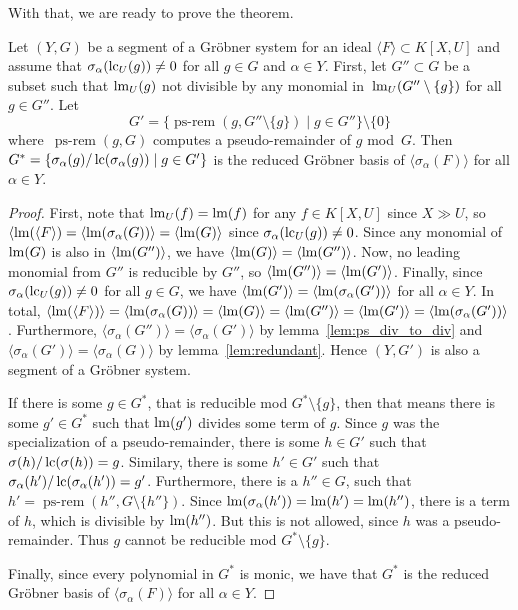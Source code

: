 With that, we are ready to prove the theorem.

\begin{theorem}\label{thm:reduce_grb_system}
  Let $(Y, G)$ be a segment of a Gröbner system for an ideal $\langle F \rangle \subset K[X, U]$ and assume that $\sigma_{\alpha}(\operatorname{lc}_{U}(g)) \neq 0$ for all $g \in G$ and $\alpha \in Y$. First, let $G'' \subset G$ be a subset such that $\operatorname{lm}_{U}(g)$ not divisible by any monomial in $\,\operatorname{lm}_{U}(G'' \setminus \{g\})$ for all $g \in G''$. Let
  \[G' = \{\operatorname{ps-rem}(g, G'' \setminus \{g\}) \mid g \in G''\} \setminus \{0\}\]
  where $\,\operatorname{ps-rem}(g, G)$ computes a pseudo-remainder of $g$ mod $\,G$.
  Then $G^{*} = \{\sigma_{\alpha}(g)/\operatorname{lc}(\sigma_{\alpha}(g)) \mid g \in G'\}$ is the reduced Gröbner basis of $\langle \sigma_{\alpha}(F) \rangle$ for all $\alpha \in Y$.
\end{theorem}
\begin{proof}
  First, note that $\operatorname{lm}_{U}(f) = \operatorname{lm}(f)$ for any $f \in K[X, U]$ since $X \gg U$, so $\langle \operatorname{lm}(\langle F \rangle) = \langle \operatorname{lm}(\sigma_{\alpha}(G)) \rangle = \langle \operatorname{lm}(G) \rangle$ since $\sigma_{\alpha}(\operatorname{lc}_{U}(g)) \neq 0$. Since any monomial of $\operatorname{lm}(G)$ is also in $\langle \operatorname{lm}(G'') \rangle$, we have $\langle \operatorname{lm}(G) \rangle = \langle \operatorname{lm}(G'') \rangle$. Now, no leading monomial from $G''$ is reducible by $G''$, so $\langle \operatorname{lm}(G'') \rangle = \langle \operatorname{lm}(G') \rangle$. Finally, since $\sigma_{\alpha}(\operatorname{lc}_{U}(g)) \neq 0$ for all $g \in G$, we have $\langle \operatorname{lm}(G') \rangle = \langle \operatorname{lm}(\sigma_{\alpha}(G')) \rangle$ for all $\alpha \in Y$. In total, $\langle \operatorname{lm}(\langle F \rangle) \rangle = \langle \operatorname{lm}(\sigma_{\alpha}(G)) \rangle = \langle \operatorname{lm}(G) \rangle = \langle \operatorname{lm}(G'') \rangle = \langle \operatorname{lm}(G') \rangle = \langle \operatorname{lm}(\sigma_{\alpha}(G')) \rangle$. Furthermore, $\langle \sigma_{\alpha}(G'') \rangle = \langle \sigma_{\alpha}(G') \rangle$ by lemma~\ref{lem:ps_div_to_div} and $\langle \sigma_{\alpha}(G') \rangle = \langle \sigma_{\alpha}(G) \rangle$ by lemma~\ref{lem:redundant}. Hence $(Y, G')$ is also a segment of a Gröbner system.

  If there is some $g \in G^{*}$, that is reducible mod $G^{*} \setminus \{g\}$, then that means there is some $g' \in G^{*}$ such that $\operatorname{lm}(g')$ divides some term of $g$. Since $g$ was the specialization of a pseudo-remainder, there is some $h \in G'$ such that $\sigma(h)/\operatorname{lc}(\sigma(h)) = g$. Similary, there is some $h' \in G'$ such that $\sigma_{\alpha}(h')/\operatorname{lc}(\sigma_{\alpha}(h')) = g'$. Furthermore, there is a $h'' \in G$, such that $h' = \operatorname{ps-rem}(h'', G \setminus \{h''\})$. Since $\operatorname{lm}(\sigma_{\alpha}(h')) = \operatorname{lm}(h') = \operatorname{lm}(h'')$, there is a term of $h$, which is divisible by $\operatorname{lm}(h'')$. But this is not allowed, since $h$ was a pseudo-remainder. Thus $g$ cannot be reducible mod $G^{*} \setminus \{g\}$.

  Finally, since every polynomial in $G^*$ is monic, we have that $G^{*}$ is the reduced Gröbner basis of $\langle \sigma_{\alpha}(F) \rangle$ for all $\alpha \in Y$.
\end{proof}

